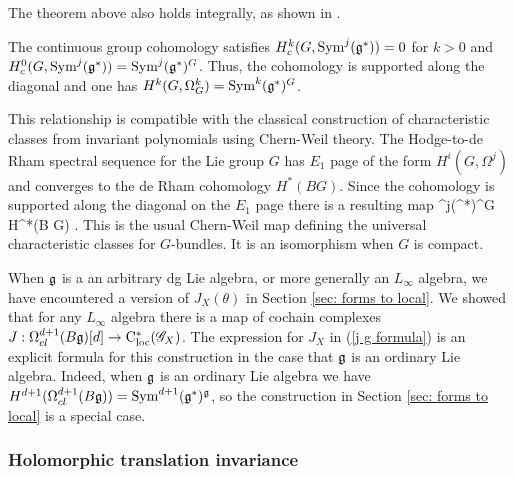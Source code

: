 \documentclass[10pt]{amsart}
\begin{document}
\begin{rmk}
The theorem above also holds integrally, as shown in \cite{Totaro}.
\end{rmk}

The continuous group cohomology satisfies $H^k_c(G, {\rm Sym}^j(\mathfrak g^*)) = 0$ for $k > 0$ and $H^0_c(G, {\rm Sym}^j(\mathfrak g^*)) = {\rm Sym}^j(\mathfrak g^*)^G$.
Thus, the cohomology is supported along the diagonal and one has $H^{k}(G, \Omega^k_G) = {\rm Sym}^k(\mathfrak g^*)^G$. 

This relationship is compatible with the classical construction of characteristic classes from invariant polynomials using Chern-Weil theory.
The Hodge-to-de Rham spectral sequence for the Lie group $G$ has $E_1$ page of the form $H^i(G, \Omega^j)$ and converges to the de Rham cohomology $H^*(BG)$. 
Since the cohomology is supported along the diagonal on the $E_1$ page there is a resulting map
\ben
\Sym^j(\fg^*)^G \to H^*(B G) .
\een
This is the usual Chern-Weil map defining the universal characteristic classes for $G$-bundles.  
It is an isomorphism when $G$ is compact.

\begin{rmk}
When $\mathfrak g$ is a an arbitrary dg Lie algebra, or more generally an $L_\infty$ algebra, we have encountered a version of $J_X(\theta)$ in Section \ref{sec: forms to local}. 
We showed that for any $L_\infty$ algebra there is a map of cochain complexes $J : \Omega^{d+1}_{cl}(B\mathfrak g) [d] \to {\rm C}_{\rm loc}^*(\mathscr G_X)$.
The expression for $J_X$ in (\ref{j g formula}) is an explicit formula for this construction in the case that $\mathfrak g$ is an ordinary Lie algebra.
Indeed, when $\mathfrak g$ is an ordinary Lie algebra we have $H^{d+1} (\Omega^{d+1}_{cl}(B\mathfrak g)) = {\rm Sym}^{d+1}(\mathfrak g^*)^\mathfrak g$, so the construction in Section \ref{sec: forms to local} is a special case.
\end{rmk}


\subsubsection{Holomorphic translation invariance}
\end{document}
